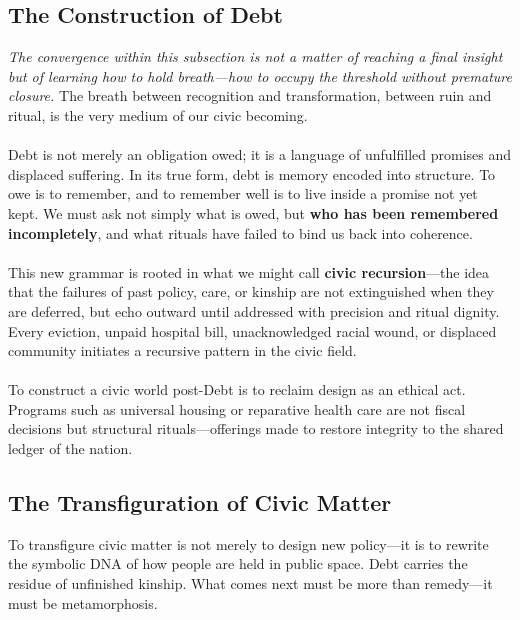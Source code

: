 \documentclass[12pt]{article}
\begin{document}
\subsection{The Construction of Debt}

\textit{The convergence within this subsection is not a matter of reaching a final insight but of learning how to hold breath---how to occupy the threshold without premature closure.} The breath between recognition and transformation, between ruin and ritual, is the very medium of our civic becoming.

\paragraph{}Debt is not merely an obligation owed; it is a language of unfulfilled promises and displaced suffering. In its true form, debt is memory encoded into structure. To owe is to remember, and to remember well is to live inside a promise not yet kept. We must ask not simply what is owed, but \textbf{who has been remembered incompletely}, and what rituals have failed to bind us back into coherence.

\paragraph{}This new grammar is rooted in what we might call \textbf{civic recursion}—the idea that the failures of past policy, care, or kinship are not extinguished when they are deferred, but echo outward until addressed with precision and ritual dignity. Every eviction, unpaid hospital bill, unacknowledged racial wound, or displaced community initiates a recursive pattern in the civic field. \cite{coates2015between,goffman2014ontherun}

\paragraph{}To construct a civic world post-Debt is to reclaim design as an ethical act. Programs such as universal housing or reparative health care are not fiscal decisions but structural rituals—offerings made to restore integrity to the shared ledger of the nation.

\subsection{The Transfiguration of Civic Matter}

To transfigure civic matter is not merely to design new policy—it is to rewrite the symbolic DNA of how people are held in public space. Debt carries the residue of unfinished kinship. What comes next must be more than remedy—it must be metamorphosis.
\end{document}

